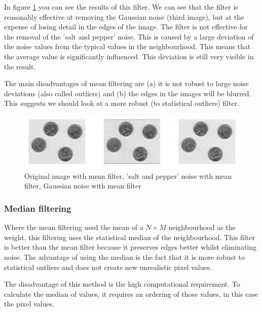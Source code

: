 \documentclass[12pt]{article}
\begin{document}
In figure \ref{noise_mean} you can see the results of this filter. We can see that the filter is reasonably effective at removing the Gaussian noise (third image), but at the expense of losing detail in the edges of the image. The filter is not effective for the removal of the 'salt and pepper' noise. This is caused by a large deviation of the noise values from the typical values in the neighbourhood. This means that the average value is significantly influenced. This deviation is still very visible in the result.
\newline

The main disadvantages of mean filtering are (a) it is not robust to large noise deviations (also called outliers) and (b) the edges in the images will be blurred. This suggests we should look at a more robust (to statistical outliers) filter.

\begin{figure}[h]
\hspace*{-2cm}
\centering
\includegraphics[scale = 1.2]{img/noise_mean}
\caption{Original image with mean filter, 'salt and pepper' noise with mean filter, Gaussian noise with mean filter}
\label{noise_mean}
\end{figure}

\subsubsection{Median filtering}

Where the mean filtering used the mean of a $N \times M$ neighbourhood as the weight, this filtering uses the statistical median of the neighbourhood. This filter is better than the mean filter because it preserves edges better whilst eliminating noise. The advantage of using the median is the fact that it is more robust to statistical outliers and does not create new unrealistic pixel values.
\newline

The disadvantage of this method is the high computational requirement. To calculate the median of values, it requires an ordering of those values, in this case the pixel values.
\newline
\end{document}
